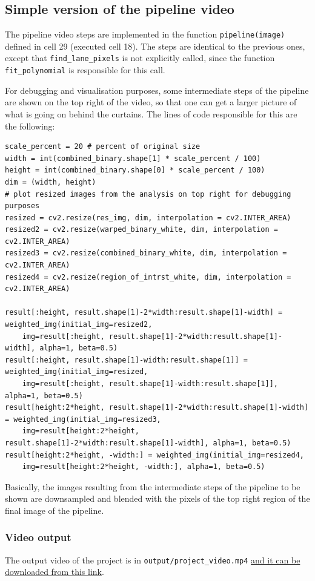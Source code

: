 \documentclass{article}
\let\cd\lstinline
\begin{document}
\subsection{Simple version of the pipeline video}
The pipeline video steps are implemented in the function \cd+pipeline(image)+ defined in cell 29 (executed cell 18). The steps are identical to the previous ones, except that \cd+find_lane_pixels+ is not explicitly called, since the function \cd+fit_polynomial+ is responsible for this call.

For debugging and visualisation purposes, some intermediate steps of the pipeline are shown on the top right of the video, so that one can get a larger picture of what is going on behind the curtains. The lines of code responsible for this are the following:
\begin{lstlisting}
scale_percent = 20 # percent of original size
width = int(combined_binary.shape[1] * scale_percent / 100)
height = int(combined_binary.shape[0] * scale_percent / 100)
dim = (width, height)
# plot resized images from the analysis on top right for debugging purposes
resized = cv2.resize(res_img, dim, interpolation = cv2.INTER_AREA)
resized2 = cv2.resize(warped_binary_white, dim, interpolation = cv2.INTER_AREA)
resized3 = cv2.resize(combined_binary_white, dim, interpolation = cv2.INTER_AREA)
resized4 = cv2.resize(region_of_intrst_white, dim, interpolation = cv2.INTER_AREA)

result[:height, result.shape[1]-2*width:result.shape[1]-width] = weighted_img(initial_img=resized2, 
    img=result[:height, result.shape[1]-2*width:result.shape[1]-width], alpha=1, beta=0.5)
result[:height, result.shape[1]-width:result.shape[1]] = weighted_img(initial_img=resized, 
    img=result[:height, result.shape[1]-width:result.shape[1]], alpha=1, beta=0.5)
result[height:2*height, result.shape[1]-2*width:result.shape[1]-width] = weighted_img(initial_img=resized3, 
    img=result[height:2*height, result.shape[1]-2*width:result.shape[1]-width], alpha=1, beta=0.5)
result[height:2*height, -width:] = weighted_img(initial_img=resized4, 
    img=result[height:2*height, -width:], alpha=1, beta=0.5)
\end{lstlisting}
Basically, the images resulting from the intermediate steps of the pipeline to be shown are downsampled and blended with the pixels of the top right region of the final image of the pipeline.

\subsubsection{Video output}
The output video of the project is in \cd+output/project_video.mp4+ \href{https://github.com/FrancescoBoi/AdvancedLaneDetection/blob/master/output/project_video.mp4}{and it can be downloaded from this link}.
\end{document}
